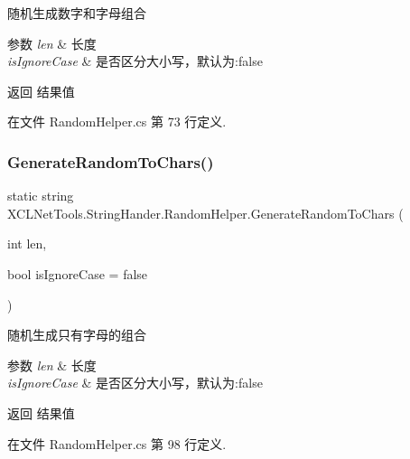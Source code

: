 随机生成数字和字母组合 


\begin{DoxyParams}{参数}
{\em len} & 长度\\
\hline
{\em is\+Ignore\+Case} & 是否区分大小写，默认为\+:false\\
\hline
\end{DoxyParams}
\begin{DoxyReturn}{返回}
结果值
\end{DoxyReturn}


在文件 Random\+Helper.\+cs 第 73 行定义.

\mbox{\label{class_x_c_l_net_tools_1_1_string_hander_1_1_random_helper_a9ed024bc1394d4af540928ea190a4d43}} 
\subsubsection{\texorpdfstring{Generate\+Random\+To\+Chars()}{GenerateRandomToChars()}}
{\footnotesize\ttfamily static string X\+C\+L\+Net\+Tools.\+String\+Hander.\+Random\+Helper.\+Generate\+Random\+To\+Chars (\begin{DoxyParamCaption}\item[{int}]{len,  }\item[{bool}]{is\+Ignore\+Case = {\ttfamily false} }\end{DoxyParamCaption})\hspace{0.3cm}{\ttfamily [static]}}



随机生成只有字母的组合 


\begin{DoxyParams}{参数}
{\em len} & 长度\\
\hline
{\em is\+Ignore\+Case} & 是否区分大小写，默认为\+:false\\
\hline
\end{DoxyParams}
\begin{DoxyReturn}{返回}
结果值
\end{DoxyReturn}


在文件 Random\+Helper.\+cs 第 98 行定义.

